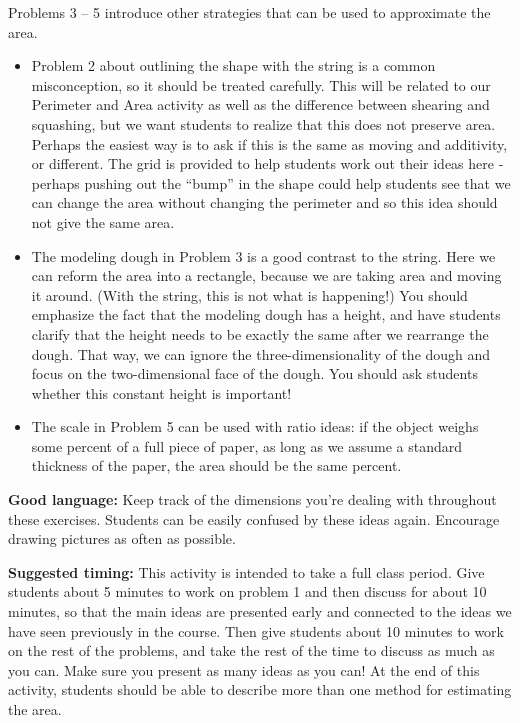 \documentclass[nooutcomes,noauthor, handout]{ximera}
\begin{document}
\begin{instructorNotes}
Problems 3 -- 5 introduce other strategies that can be used to approximate the area.
\begin{itemize}
	\item Problem 2 about outlining the shape with the string is a common misconception, so it should be treated carefully. This will be related to our Perimeter and Area activity as well as the difference between shearing and squashing, but we want students to realize that this does not preserve area. Perhaps the easiest way is to ask if this is the same as moving and additivity, or different. The grid is provided to help students work out their ideas here - perhaps pushing out the ``bump'' in the shape could help students see that we can change the area without changing the perimeter and so this idea should not give the same area.
	\item The modeling dough in Problem 3 is a good contrast to the string. Here we can reform the area into a rectangle, because we are taking area and moving it around. (With the string, this is not what is happening!) You should emphasize the fact that the modeling dough has a height, and have students clarify that the height needs to be exactly the same after we rearrange the dough. That way, we can ignore the three-dimensionality of the dough and focus on the two-dimensional face of the dough. You should ask students whether this constant height is important!
	\item The scale in Problem 5 can be used with ratio ideas: if the object weighs some percent of a full piece of paper, as long as we assume a standard thickness of the paper, the area should be the same percent.
	
\end{itemize}



{\bf Good language:} Keep track of the dimensions you're dealing with throughout these exercises. Students can be easily confused by these ideas again. Encourage drawing pictures as often as possible.



{\bf Suggested timing:} This activity is intended to take a full class period. Give students about 5 minutes to work on problem 1 and then discuss for about 10 minutes, so that the main ideas are presented early and connected to the ideas we have seen previously in the course. Then give students about 10 minutes to work on the rest of the problems, and take the rest of the time to discuss as much as you can. Make sure you present as many ideas as you can! At the end of this activity, students should be able to describe more than one method for estimating the area.




\end{instructorNotes}
\end{document}
